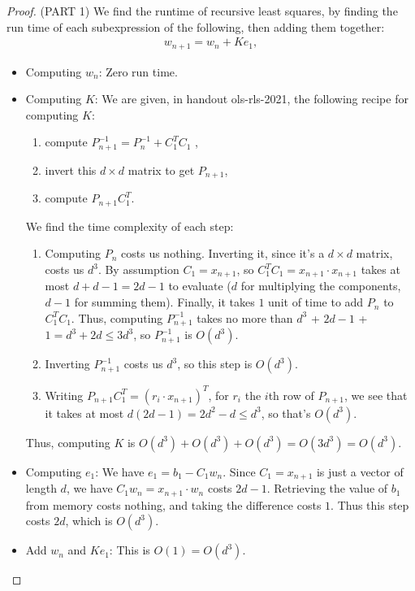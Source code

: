 \documentclass[12pt]{article}
\newcommand\inv[1]{#1^{-1}}
\begin{document}
\begin{proof}
  (PART 1) We find the runtime of recursive least squares, by finding the run time of each subexpression of the following, then adding them together:
  \begin{align*}
    w_{n+1} = w_{n} +Ke_1,
  \end{align*}
  \begin{itemize}
  \item
    Computing $w_n$: Zero run time.
  \item
    Computing $K$: We are given, in handout ols-rls-2021, the following recipe for computing $K$: 
  \begin{enumerate}
  \item
    compute $\inv{P}_{n+1} = \inv{P}_n + C_1^TC_1$ ,
  \item
    invert this $d \times d$ matrix to get $P_{n+1}$,
  \item
    compute $P_{n+1}C_1^T$.
  \end{enumerate}
  We find the time complexity of each step:
  \begin{enumerate}
  \item
    Computing  $P_n$ costs us nothing. Inverting it, since it's a $d \times d$ matrix, costs us $d^3$. By assumption $C_1 = x_{n+1}$, so $C_1^T C_1 = x_{n+1} \cdot x_{n+1}$ takes at most $d+ d-1 = 2d-1$ to evaluate ($d$ for multiplying the components, $d-1$ for summing them). Finally, it takes $1$ unit of time to add $P_n$ to $C_1^T C_1$. Thus, computing $P_{n+1}^{-1}$ takes no more than $d^3$ + $2d-1$ + $1= d^3 + 2d \leq 3d^3$, so $\inv{P}_{n+1}$ is $O(d^3)$.
  \item
    Inverting $P_{n+1}^{-1}$ costs us $d^3$, so this step is $O(d^3)$.
  \item
    Writing $P_{n+1}C_1^T = (r_i \cdot x_{n+1})^T$, for $r_i$ the $i$th row of $P_{n+1}$, we see that it takes at most $d(2d-1) = 2d^2-d \leq d^3$, so that's $O(d^3)$. 
  \end{enumerate}
  Thus, computing $K$ is $O(d^3) + O(d^3) + O(d^3) = O(3d^3) = O(d^3)$.
\item Computing $e_1$:
  We have $e_1 = b_1 - C_1 w_n$. Since $C_1 = x_{n+1}$ is just a vector of length $d$, we have $C_1 w_n = x_{n+1} \cdot w_n$ costs $2d-1$. Retrieving the value of $b_1$ from memory costs nothing, and taking the difference costs $1$. Thus this step costs
  $2d$, which is $O(d^3)$.
\item
  Add
  $w_n$ and $Ke_1$: This is $O(1)=O(d^3)$.
  \end{itemize}

\end{proof}
\end{document}

